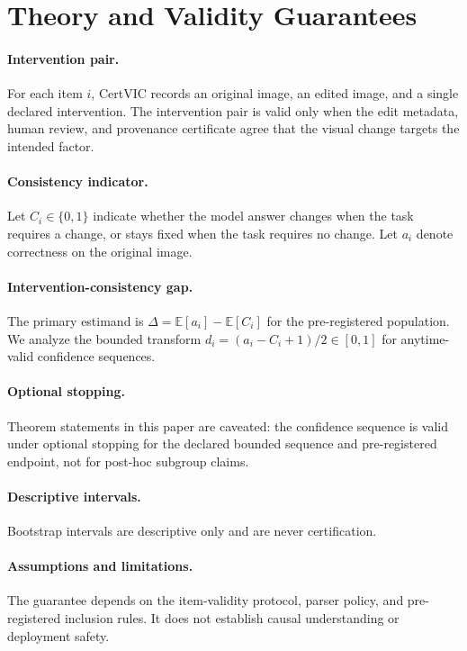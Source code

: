 \section{Theory and Validity Guarantees}

\paragraph{Intervention pair.}
For each item $i$, CertVIC records an original image, an edited image, and a
single declared intervention. The intervention pair is valid only when the edit
metadata, human review, and provenance certificate agree that the visual change
targets the intended factor.

\paragraph{Consistency indicator.}
Let $C_i \in \{0,1\}$ indicate whether the model answer changes when the task
requires a change, or stays fixed when the task requires no change. Let $a_i$
denote correctness on the original image.

\paragraph{Intervention-consistency gap.}
The primary estimand is $\Delta = \mathbb{E}[a_i] - \mathbb{E}[C_i]$ for the
pre-registered population. We analyze the bounded transform
$d_i=(a_i-C_i+1)/2 \in [0,1]$ for anytime-valid confidence sequences.

\paragraph{Optional stopping.}
Theorem statements in this paper are caveated: the confidence sequence is valid
under optional stopping for the declared bounded sequence and pre-registered
endpoint, not for post-hoc subgroup claims.

\paragraph{Descriptive intervals.}
Bootstrap intervals are descriptive only and are never certification.

\paragraph{Assumptions and limitations.}
The guarantee depends on the item-validity protocol, parser policy, and
pre-registered inclusion rules. It does not establish causal understanding or
deployment safety.

